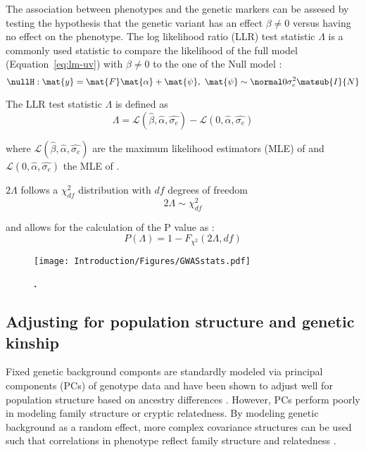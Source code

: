 \noindent The association between phenotypes and the genetic markers can be assesed by testing the hypothesis that the genetic variant has an effect \(\beta \neq 0\) versus having no effect on the phenotype. The log likelihood ratio (LLR) test statistic \(\Lambda\) is a commonly used statistic to compare the likelihood of the full model \taltH (Equation~\ref{eq:lm-uv}) with \(\beta \neq 0\) to the one of the Null model \tnullH:
\begin{equation}
\nullH: \mat{y} =\mat{F}\mat{\alpha}  + \mat{\psi},\text{ }
\mat{\psi}\sim \normal 0 {\sigma_e^2\matsub{I}{N}}
\label{eq:lm_null}
\end{equation}

\noindent The LLR test statistic \(\Lambda\) is defined as
\begin{equation}
\Lambda  =  \mathcal{L} (\hat{\beta}, \hat{\alpha}, \hat{\sigma_{e}}) -  \mathcal{L} (0, \hat{\alpha}, \hat{\sigma_{e}})
\label{eq:llr}
\end{equation}

\noindent where \(\mathcal{L} (\hat{\beta}, \hat{\alpha}, \hat{\sigma_{e}})\) are the maximum likelihood estimators (MLE) of  \taltH and \(\mathcal{L} (0, \hat{\alpha}, \hat{\sigma_{e}})\) the MLE of \tnullH. 

\noindent \(2\Lambda\) follows a \(\chi^2_{df}\) distribution with \(df\) degrees of freedom \citep{Wilks1938} 
\begin{equation}
2\Lambda \sim \chi^2_{df} 
\label{eq:lambda}
\end{equation}

\noindent and allows for the calculation of the P value as :
\begin{equation}
P(\Lambda) = 1 - F_{\chi^2}(2\Lambda, df)
\label{eq:pvalue}
\end{equation}

\begin{figure}[hbtp]
	\centering
	\texttt{[image: Introduction/Figures/GWASstats.pdf]}
	\caption[\textbf{.}]{\textbf{.} } 
	 	\label{fig:GWAs-stats}
\end{figure}

\subsection{Adjusting for population structure and genetic kinship}
Fixed genetic background componts are standardly modeled via principal components (PCs) of genotype data \citep{Price2006} and have been shown to adjust well for population structure based on ancestry differences \citep{Patterson2006}. However, PCs perform poorly in modeling family structure or cryptic relatedness.  By modeling genetic background as a random effect, more complex covariance structures can be used such that correlations in phenotype reflect family structure and relatedness \citep{Yu2006,Kang2008}.
	
